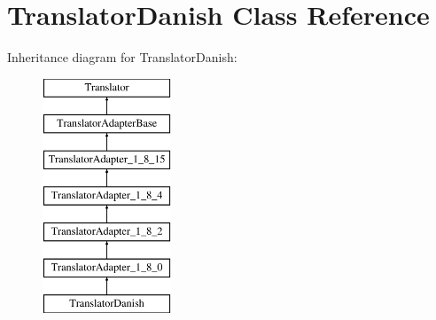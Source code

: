 \hypertarget{class_translator_danish}{}\section{Translator\+Danish Class Reference}
\label{class_translator_danish}
Inheritance diagram for Translator\+Danish\+:\begin{figure}[H]
\begin{center}
\leavevmode
\includegraphics[height=7.000000cm]{class_translator_danish}
\end{center}
\end{figure}
